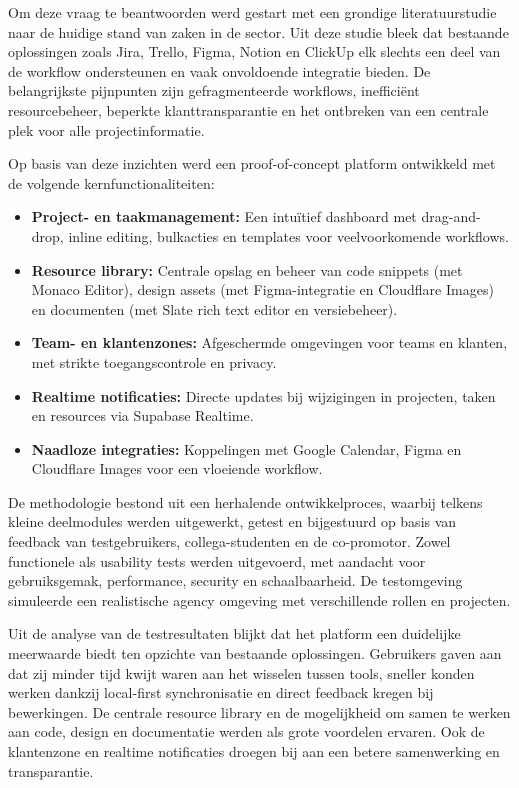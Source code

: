 Om deze vraag te beantwoorden werd gestart met een grondige literatuurstudie naar de huidige stand van zaken in de sector. Uit deze studie bleek dat bestaande oplossingen zoals Jira, Trello, Figma, Notion en ClickUp elk slechts een deel van de workflow ondersteunen en vaak onvoldoende integratie bieden. De belangrijkste pijnpunten zijn gefragmenteerde workflows, inefficiënt resourcebeheer, beperkte klanttransparantie en het ontbreken van een centrale plek voor alle projectinformatie.

Op basis van deze inzichten werd een proof-of-concept platform ontwikkeld met de volgende kernfunctionaliteiten:
\begin{itemize}
    \item \textbf{Project- en taakmanagement:} Een intuïtief dashboard met drag-and-drop, inline editing, bulkacties en templates voor veelvoorkomende workflows.
    \item \textbf{Resource library:} Centrale opslag en beheer van code snippets (met Monaco Editor), design assets (met Figma-integratie en Cloudflare Images) en documenten (met Slate rich text editor en versiebeheer).
    \item \textbf{Team- en klantenzones:} Afgeschermde omgevingen voor teams en klanten, met strikte toegangscontrole en privacy.
    \item \textbf{Realtime notificaties:} Directe updates bij wijzigingen in projecten, taken en resources via Supabase Realtime.
    \item \textbf{Naadloze integraties:} Koppelingen met Google Calendar, Figma en Cloudflare Images voor een vloeiende workflow.
\end{itemize}

De methodologie bestond uit een herhalende ontwikkelproces, waarbij telkens kleine deelmodules werden uitgewerkt, getest en bijgestuurd op basis van feedback van testgebruikers, collega-studenten en de co-promotor. Zowel functionele als usability tests werden uitgevoerd, met aandacht voor gebruiksgemak, performance, security en schaalbaarheid. De testomgeving simuleerde een realistische agency omgeving met verschillende rollen en projecten.

Uit de analyse van de testresultaten blijkt dat het platform een duidelijke meerwaarde biedt ten opzichte van bestaande oplossingen. Gebruikers gaven aan dat zij minder tijd kwijt waren aan het wisselen tussen tools, sneller konden werken dankzij local-first synchronisatie en direct feedback kregen bij bewerkingen. De centrale resource library en de mogelijkheid om samen te werken aan code, design en documentatie werden als grote voordelen ervaren. Ook de klantenzone en realtime notificaties droegen bij aan een betere samenwerking en transparantie.

